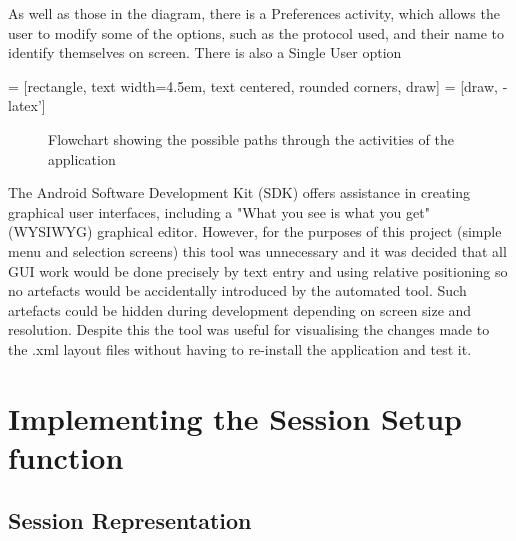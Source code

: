 As well as those in the diagram, there is a Preferences activity, which allows the user to modify some of the options, such as the protocol used, and their name to identify themselves on screen. There is also a Single User option 

 = [rectangle, text width=4.5em, text centered, rounded corners, draw]
 = [draw, -latex']
\begin{figure}[ht]
\centering
{}
\caption{Flowchart showing the possible paths through the activities of the application}
\label{fig:menu_structure}
\end{figure}

The Android Software Development Kit (SDK) offers assistance in creating graphical user interfaces, including a "What you see is what you get" (WYSIWYG) graphical editor. However, for the purposes of this project (simple menu and selection screens) this tool was unnecessary and it was decided that all GUI work would be done precisely by text entry and using relative positioning so no artefacts would be accidentally introduced by the automated tool. Such artefacts could be hidden during development depending on screen size and resolution. Despite this the tool was useful for visualising the changes made to the .xml layout files without having to re-install the application and test it.

\section{Implementing the Session Setup function}

\subsection{Session Representation}

